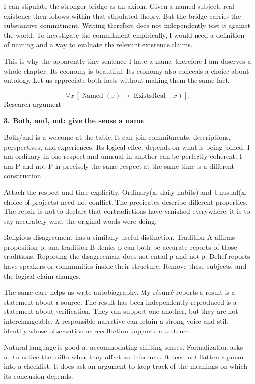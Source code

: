 \documentclass[10pt]{article}
\begin{document}
I can stipulate the stronger bridge as an axiom. Given a named subject, real existence then follows within that stipulated theory. But the bridge carries the substantive commitment. Writing therefore does not independently test it against the world. To investigate the commitment empirically, I would need a definition of naming and a way to evaluate the relevant existence claims.\par
This is why the apparently tiny sentence I have a name; therefore I am deserves a whole chapter. Its economy is beautiful. Its economy also conceals a choice about ontology. Let us appreciate both facts without making them the same fact.\par
\[\forall x\,[\operatorname{Named}(x)\to\operatorname{ExistsReal}(x)].\]
\clearpage
{\small\color{accent}Research argument}\par
{\LARGE\bfseries\color{ink}3. Both, and, not: give the sense a name}\par\vspace{7pt}
Both/and is a welcome at the table. It can join commitments, descriptions, perspectives, and experiences. Its logical effect depends on what is being joined. I am ordinary in one respect and unusual in another can be perfectly coherent. I am P and not P in precisely the same respect at the same time is a different construction.\par
Attach the respect and time explicitly. Ordinary(x, daily habits) and Unusual(x, choice of projects) need not conflict. The predicates describe different properties. The repair is not to declare that contradictions have vanished everywhere; it is to say accurately what the original words were doing.\par
Religious disagreement has a similarly useful distinction. Tradition A affirms proposition p, and tradition B denies p can both be accurate reports of those traditions. Reporting the disagreement does not entail p and not p. Belief reports have speakers or communities inside their structure. Remove those subjects, and the logical claim changes.\par
The same care helps us write autobiography. My résumé reports a result is a statement about a source. The result has been independently reproduced is a statement about verification. They can support one another, but they are not interchangeable. A responsible narrative can retain a strong voice and still identify whose observation or recollection supports a sentence.\par
Natural language is good at accommodating shifting senses. Formalization asks us to notice the shifts when they affect an inference. It need not flatten a poem into a checklist. It does ask an argument to keep track of the meanings on which its conclusion depends.\par
\end{document}
